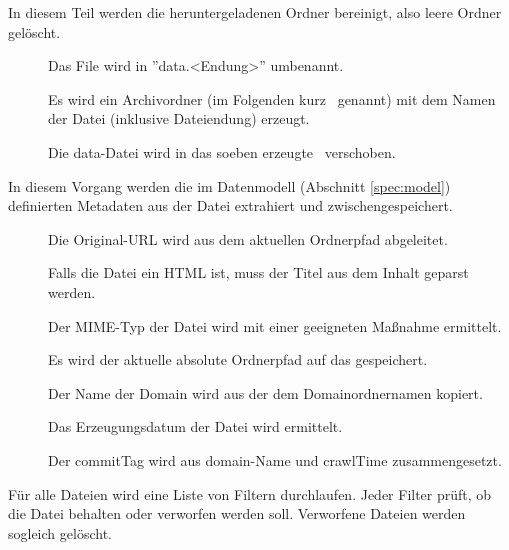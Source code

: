 \begin{description}
\begin{description}
		\end{description}
	\item [\req{Bereinigung}{clean}]
		In diesem Teil werden die heruntergeladenen Ordner bereinigt,
		also leere Ordner gelöscht.
	\item [\req{Normalisierung}{normalize}]
		\begin{description}
			\item []
				Das File wird in ''data.<Endung>'' umbenannt. 
			\item [] 
				Es wird ein Archivordner (im Folgenden kurz \arc\ genannt) 
				mit dem Namen der Datei (inklusive Dateiendung) 
				erzeugt.
			\item []
				Die data-Datei wird in das soeben erzeugte \arc\ verschoben.
		\end{description}
	\item [\req{Extraktion der Metadaten}{metaextract}]
		In diesem Vorgang werden die im Datenmodell (Abschnitt \ref{spec:model}) 
		definierten Metadaten 
		aus der Datei extrahiert und zwischengespeichert. 
		\begin{description}
			\item []
				Die Original-URL wird aus dem aktuellen Ordnerpfad abgeleitet.
			\item []
				Falls die Datei ein HTML ist, 
				muss der Titel aus dem Inhalt geparst werden.
			\item []
				Der MIME-Typ der Datei wird mit einer geeigneten Maßnahme ermittelt.
			\item []
				Es wird der aktuelle absolute Ordnerpfad auf das \arc gespeichert.
			\item []
				Der Name der Domain wird aus der dem Domainordnernamen kopiert.
			\item []
				Das Erzeugungsdatum der Datei wird ermittelt.
			\item []
				Der commitTag wird aus domain-Name und crawlTime zusammengesetzt.
		\end{description}
	\item [\req{Filterung}{filter}]
		Für alle Dateien wird eine Liste von Filtern durchlaufen.
		Jeder Filter prüft, ob die Datei behalten oder verworfen werden soll.
		Verworfene Dateien werden sogleich gelöscht.
	\item [\req{commitTime speichern}{commitTime}]

\end{description}
